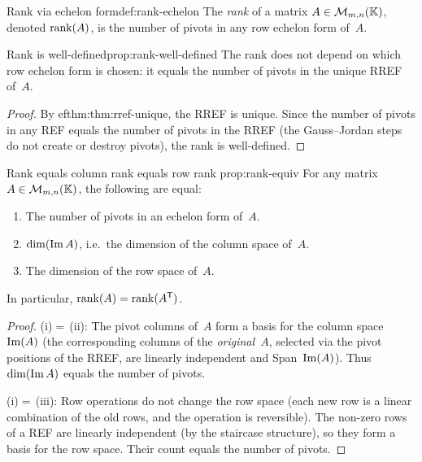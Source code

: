 \begin{definition}{Rank via echelon form}{def:rank-echelon}
The \emph{rank} of a matrix $A\in\mathcal{M}_{m,n}({\mathbb{K}})$, denoted
$\operatorname{rank}(A)$, is the number of pivots in any row echelon form of~$A$.
\end{definition}

\begin{proposition}{Rank is well-defined}{prop:rank-well-defined}
The rank does not depend on which row echelon form is chosen: it
equals the number of pivots in the unique RREF of~$A$.
\end{proposition}

\begin{proof}
By 
ef{thm:thm:rref-unique}, the RREF is unique. Since the number of
pivots in any REF equals the number of pivots in the RREF (the
Gauss--Jordan steps do not create or destroy pivots), the rank is
well-defined.
\end{proof}

\begin{proposition}{Rank equals column rank equals row rank}%
{prop:rank-equiv}
For any matrix $A\in\mathcal{M}_{m,n}({\mathbb{K}})$, the following are equal:
\begin{enumerate}[label=(\roman*)]
  \item The number of pivots in an echelon form of~$A$.
  \item $\dim(\operatorname{Im} A)$, i.e.\ the dimension of the column space
    of~$A$.
  \item The dimension of the row space of~$A$.
\end{enumerate}
In particular, $\operatorname{rank}(A) = \operatorname{rank}({A}^{\mathsf{T}})$.
\end{proposition}

\begin{proof}
(i)$=$\,(ii): The pivot columns of~$A$ form a basis for the column
space $\operatorname{Im}(A)$ (the corresponding columns of the
\emph{original}~$A$, selected via the pivot positions of the RREF,
are linearly independent and Span~$\operatorname{Im}(A)$). Thus
$\dim(\operatorname{Im} A)$ equals the number of pivots.

(i)$=$\,(iii): Row operations do not change the row space (each new
row is a linear combination of the old rows, and the operation is
reversible). The non-zero rows of a REF are linearly independent
(by the staircase structure), so they form a basis for the row space.
Their count equals the number of pivots.
\end{proof}

